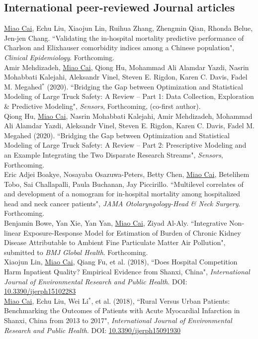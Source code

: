 \documentclass[11pt, a4paper]{article}
\newcommand{\years}[1]{\marginnote{\scriptsize #1}}
\begin{document}
\subsection*{International peer-reviewed Journal articles}
\noindent
\years{2020}\underline{Miao Cai}, Echu Liu, Xiaojun Lin, Ruihua Zhang, Zhengmin Qian, Rhonda Belue, Jen-jen Chang. ``Validating the in-hospital mortality predictive performance of Charlson and Elixhauser comorbidity indices among a Chinese population", \emph{Clinical Epidemiology}. Forthcoming.\\ 
\years{2020}Amir Mehdizadeh, \underline{Miao Cai}, Qiong Hu, Mohammad Ali Alamdar Yazdi, Nasrin Mohabbati Kalejahi, Aleksandr Vinel, Steven E. Rigdon, Karen C. Davis, Fadel M. Megahed$^\ast$ (2020). ``Bridging the Gap between Optimization and Statistical Modeling of Large Truck Safety: A Review -- Part 1: Data Collection, Exploration \& Predictive Modeling", \emph{Sensors}, Forthcoming, (co-first author). \\
\years{2020} Qiong Hu, \underline{Miao Cai}, Nasrin Mohabbati Kalejahi, Amir Mehdizadeh, Mohammad Ali Alamdar Yazdi, Aleksandr Vinel, Steven E. Rigdon, Karen C. Davis, Fadel M. Megahed (2020). ``Bridging the Gap between Optimization and Statistical Modeling of Large Truck Safety: A Review -- Part 2: Prescriptive Modeling and an Example Integrating the Two Disparate Research Streams", \emph{Sensors}, Forthcoming.\\
\years{2020}Eric Adjei Boakye, Nosayaba Osazuwa-Peters, Betty Chen, \underline{Miao Cai}, Betelihem Tobo, Sai Challapalli, Paula Buchanan, Jay Piccirillo. ``Multilevel correlates of and development of a nomogram for in-hospital mortality among hospitalized head and neck cancer patients", \emph{JAMA Otolaryngology-Head \& Neck Surgery}. Forthcoming.\\
\years{2020}Benjamin Bowe, Yan Xie, Yan Yan, \underline{Miao Cai}, Ziyad Al-Aly. ``Integrative Non-linear Exposure-Response Model for Estimation of Burden of Chronic Kidney Disease Attributable to Ambient Fine Particulate Matter Air Pollution", submitted to \emph{BMJ Global Health}. Forthcoming.\\
\years{2018}Xiaojun Lin, \underline{Miao Cai}, Qiang Fu, et al. (2018), ``Does Hospital Competition Harm Inpatient Quality? Empirical Evidence from Shanxi, China", \emph{International Journal of Environmental Research and Public Health}. DOI: \href{https://doi.org/10.3390/ijerph15102283}{10.3390/ijerph15102283}\\
\years{2018}\underline{Miao Cai}, Echu Liu, Wei Li$^\ast$, et al. (2018), ``Rural Versus Urban Patients: Benchmarking the Outcomes of Patients with Acute Myocardial Infarction in Shanxi, China from 2013 to 2017", \emph{International Journal of Environmental Research and Public Health}. DOI: \href{https://doi.org/10.3390/ijerph15091930}{10.3390/ijerph15091930}\\
\end{document}

